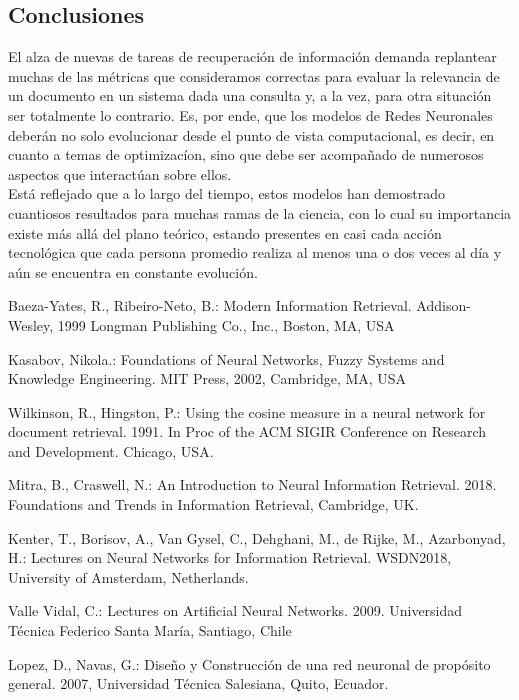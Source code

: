 \documentclass{llncs}
\begin{document}
\begin{multicols}{2}[]
\section{Conclusiones}

El alza de nuevas de tareas de recuperaci\'on de informaci\'on demanda replantear muchas de las m\'etricas que consideramos correctas para evaluar la relevancia
de un documento en un sistema dada una consulta y, a la vez, para otra situaci\'on ser totalmente lo contrario. Es, por ende, que los modelos de Redes Neuronales
deber\'an no solo evolucionar desde el punto de vista computacional, es decir, en cuanto a temas de optimizac\'ion, sino que debe ser acompa\~nado de numerosos
aspectos que interac\-t\'uan sobre ellos. \\
Est\'a reflejado que a lo largo del tiempo, estos modelos han demostrado cuantiosos resultados para muchas ramas de la ciencia, con lo cual su importancia existe
m\'as all\'a del plano te\'orico, estando presentes en casi cada acci\'on tecnol\'ogica que cada persona promedio realiza al menos una o dos veces al d\'ia y a\'un se
encuentra en constante evoluci\'on.


\end{multicols}
\begin{thebibliography}{1}

Baeza-Yates, R., Ribeiro-Neto, B.:
Modern Information Retrieval.
Addison-Wesley, 1999
Longman Publishing Co., Inc., Boston, MA, USA

Kasabov, Nikola.:
Foundations of Neural Networks, Fuzzy Systems and Knowledge Engineering.
MIT Press, 2002, Cambridge, MA, USA

Wilkinson, R., Hingston, P.:
Using the cosine measure in a neural network for document retrieval. 1991.
In Proc of the ACM SIGIR Conference on Research and Development. Chicago, USA.

Mitra, B., Craswell, N.:
An Introduction to Neural Information Retrieval. 2018.
Foundations and Trends in Information Retrieval, Cambridge, UK.

Kenter, T., Borisov, A., Van Gysel, C., Dehghani, M., de Rijke, M., Azarbonyad, H.:
Lectures on Neural Networks for Information Retrieval.
WSDN2018, University of Amsterdam, Netherlands.

Valle Vidal, C.:
Lectures on Artificial Neural Networks. 2009.
Universidad T\'ecnica Federico Santa Mar\'ia, Santiago, Chile

Lopez, D., Navas, G.:
Dise\~no y Construcci\'on de una red neuronal de prop\'osito general.
2007, Universidad T\'ecnica Salesiana, Quito, Ecuador.

\end{thebibliography}
\end{document}
